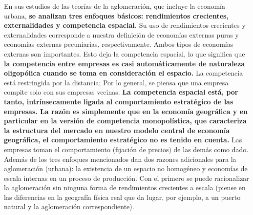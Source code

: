 En sus estudios de las teorías de la aglomeración, que incluye la economía urbana, \textbf{se analizan tres enfoques básicos: rendimientos crecientes, externalidades y competencia espacial.} Su uso de rendimientos crecientes y externalidades corresponde a nuestra definición de economías externas puras y economías externas pecuniarias, respectivamente. Ambos tipos de economías externas son importantes. Esto deja la competencia espacial, lo que significa que \textbf{la competencia entre empresas es casi automáticamente de naturaleza oligopólica cuando se toma en consideración el espacio.} La competencia está restringida por la distancia; Por lo general, se piensa que una empresa compite solo con sus empresas vecinas. \textbf{La competencia espacial está, por tanto, intrínsecamente ligada al comportamiento estratégico de las empresas. La razón es simplemente que en la economía geográfica y en particular en la versión de competencia monopolística, que caracteriza la estructura del mercado en nuestro modelo central de economía geográfica, el comportamiento estratégico no es tenido en cuenta.} Las empresas toman el comportamiento (fijación de precios) de las demás como dado. Además de los tres enfoques mencionados dan dos razones adicionales para la aglomeración (urbana): la existencia de un espacio no homogéneo y economías de escala internas en un proceso de producción. Con el primero se puede racionalizar la aglomeración sin ninguna forma de rendimientos crecientes a escala (piense en las diferencias en la geografía física real que da lugar, por ejemplo, a un puerto natural y la aglomeración correspondiente).

